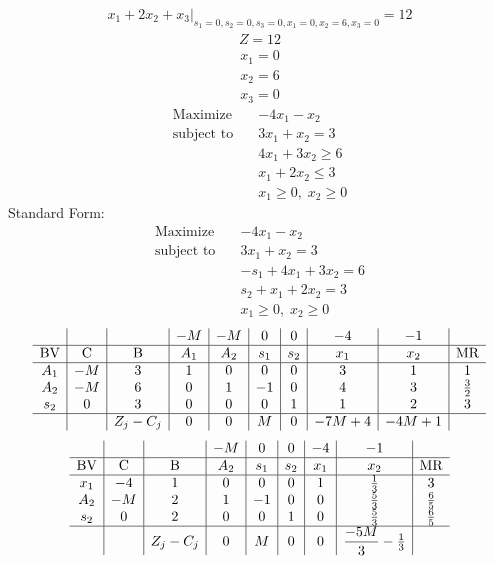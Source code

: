 \documentclass{article}
\begin{document}
\begin{align*}
\left.x_{1} + 2x_{2} + x_{3}\right|_{s_{1}=0,s_{2}=0,s_{3}=0,x_{1}=0,x_{2}=6,x_{3}=0}=12\end{align*}
\begin{align*}
Z=12\end{align*}
\begin{align*}
x_{1}=0\end{align*}
\begin{align*}
x_{2}=6\end{align*}
\begin{align*}
x_{3}=0\end{align*}
\begin{align*}
\text{Maximize} \quad & -4x_{1} - x_{2}\\
\text{subject to} \quad
& 3x_{1} + x_{2}=3\\
& 4x_{1} + 3x_{2}\ge6\\
& x_{1} + 2x_{2}\le3\\
& x_{1}\ge0,\; x_{2}\ge0\end{align*}
Standard Form:\\
\begin{align*}
\text{Maximize} \quad & -4x_{1} - x_{2}\\
\text{subject to} \quad
& 3x_{1} + x_{2}=3\\
& -s_{1} + 4x_{1} + 3x_{2}=6\\
& s_{2} + x_{1} + 2x_{2}=3\\
& x_{1}\ge0,\; x_{2}\ge0\end{align*}
\begin{align*}
\begin{array}{c|c|c|c|c|c|c|c|c|c}
 &  &  & -M & -M & 0 & 0 & -4 & -1 & \\
\hline
\text{BV} & \text{C} & \text{B} & A_{1} & A_{2} & s_{1} & s_{2} & x_{1} & x_{2} & \text{MR} \\
\hline
A_{1} & -M & 3 & 1 & 0 & 0 & 0 & 3 & 1 & 1 \\
A_{2} & -M & 6 & 0 & 1 & -1 & 0 & 4 & 3 & \frac{3}{2} \\
s_{2} & 0 & 3 & 0 & 0 & 0 & 1 & 1 & 2 & 3 \\
\hline
 &  & Z_j-C_j & 0 & 0 & M & 0 & -7M + 4 & -4M + 1 & \\
\end{array}
\end{align*}
\begin{align*}
\begin{array}{c|c|c|c|c|c|c|c|c}
 &  &  & -M & 0 & 0 & -4 & -1 & \\
\hline
\text{BV} & \text{C} & \text{B} & A_{2} & s_{1} & s_{2} & x_{1} & x_{2} & \text{MR} \\
\hline
x_{1} & -4 & 1 & 0 & 0 & 0 & 1 & \frac{1}{3} & 3 \\
A_{2} & -M & 2 & 1 & -1 & 0 & 0 & \frac{5}{3} & \frac{6}{5} \\
s_{2} & 0 & 2 & 0 & 0 & 1 & 0 & \frac{5}{3} & \frac{6}{5} \\
\hline
 &  & Z_j-C_j & 0 & M & 0 & 0 & \dfrac{-5M}{3} - \frac{1}{3} & \\
\end{array}
\end{align*}
\end{document}
